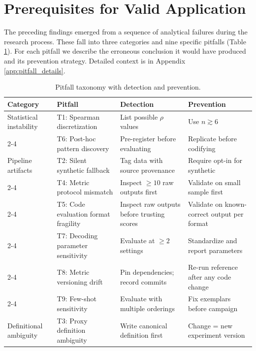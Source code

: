 \documentclass[pdflatex,sn-mathphys-ay,oneside]{sn-jnl}
\theoremstyle{thmstylethree}
\begin{document}
\section{Prerequisites for Valid Application}\label{sec:pitfalls}

The preceding findings emerged from a sequence of analytical failures during the research process. These fall into three categories and nine specific pitfalls (Table~
\ref{tab:pitfalls_summary}). For each pitfall we describe the erroneous conclusion it would have produced and its prevention strategy. Detailed context is in Appendix~
\ref{app:pitfall_details}.

\begin{table}[t]
\centering
\caption{Pitfall taxonomy with detection and prevention.}
\label{tab:pitfalls_summary}
\footnotesize
\setlength{\tabcolsep}{4pt}
\begin{tabular}{p{2.5cm}p{3cm}p{3.2cm}p{3.5cm}}\toprule
\textbf{Category} & \textbf{Pitfall} & \textbf{Detection} & \textbf{Prevention} \\\midrule
Statistical instability & T1: Spearman discretization & List possible $\rho$ values & Use $n\gtrsim6$ \\
\cmidrule{2-4}
 & T6: Post-hoc pattern discovery & Pre-register before evaluating & Replicate before codifying \\
\midrule
Pipeline artifacts & T2: Silent synthetic fallback & Tag data with source provenance & Require opt-in for synthetic \\
\cmidrule{2-4}
 & T4: Metric protocol mismatch & Inspect $\ge10$ raw outputs first & Validate on small sample first \\
\cmidrule{2-4}
 & T5: Code evaluation format fragility & Inspect raw outputs before trusting scores & Validate on known-correct output per format \\
\cmidrule{2-4}
 & T7: Decoding parameter sensitivity & Evaluate at $\ge2$ settings & Standardize and report parameters \\
\cmidrule{2-4}
 & T8: Metric versioning drift & Pin dependencies; record commits & Re-run reference after any code change \\
\cmidrule{2-4}
 & T9: Few-shot sensitivity & Evaluate with multiple orderings & Fix exemplars before campaign \\
\midrule
Definitional ambiguity & T3: Proxy definition ambiguity & Write canonical definition first & Change = new experiment version \\
\bottomrule
\end{tabular}
\end{table}
\end{document}
